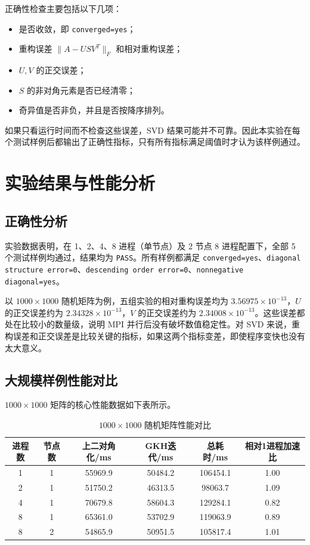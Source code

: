 \documentclass[UTF8,a4paper,12pt]{ctexart}
\begin{document}
正确性检查主要包括以下几项：
\begin{itemize}
  \item 是否收敛，即 \texttt{converged=yes}；
  \item 重构误差 $\|A-USV^T\|_F$ 和相对重构误差；
  \item $U,V$ 的正交误差；
  \item $S$ 的非对角元素是否已经清零；
  \item 奇异值是否非负，并且是否按降序排列。
\end{itemize}

如果只看运行时间而不检查这些误差，SVD 结果可能并不可靠。因此本实验在每个测试样例后都输出了正确性指标，只有所有指标满足阈值时才认为该样例通过。

\section{实验结果与性能分析}

\subsection{正确性分析}

实验数据表明，在 1、2、4、8 进程（单节点）及 2 节点 8 进程配置下，全部 5 个测试样例均通过，结果均为 \texttt{PASS}。所有样例都满足 \texttt{converged=yes}、\texttt{diagonal structure error=0}、\texttt{descending order error=0}、\texttt{nonnegative diagonal=yes}。

以 $1000\times1000$ 随机矩阵为例，五组实验的相对重构误差均为 $3.56975\times10^{-13}$，$U$ 的正交误差约为 $2.34328\times10^{-13}$，$V$ 的正交误差约为 $2.34008\times10^{-13}$。这些误差都处在比较小的数量级，说明 MPI 并行后没有破坏数值稳定性。对 SVD 来说，重构误差和正交误差是比较关键的指标，如果这两个指标变差，即使程序变快也没有太大意义。

\subsection{大规模样例性能对比}

$1000\times1000$ 矩阵的核心性能数据如下表所示。

\begin{table}[H]
\centering
\caption{$1000\times1000$ 随机矩阵性能对比}
\begin{tabular}{cccccc}
\toprule
进程数 & 节点数 & 上二对角化/ms & GKH迭代/ms & 总耗时/ms & 相对1进程加速比 \\
\midrule
1 & 1 & 55969.9 & 50484.2 & 106454.1 & 1.00 \\
2 & 1 & 51750.2 & 46313.5 & 98063.7 & 1.09 \\
4 & 1 & 70679.8 & 58604.3 & 129284.1 & 0.82 \\
8 & 1 & 65361.0 & 53702.9 & 119063.9 & 0.89 \\
8 & 2 & 54865.9 & 50951.5 & 105817.4 & 1.01 \\
\bottomrule
\end{tabular}
\end{table}
\end{document}
